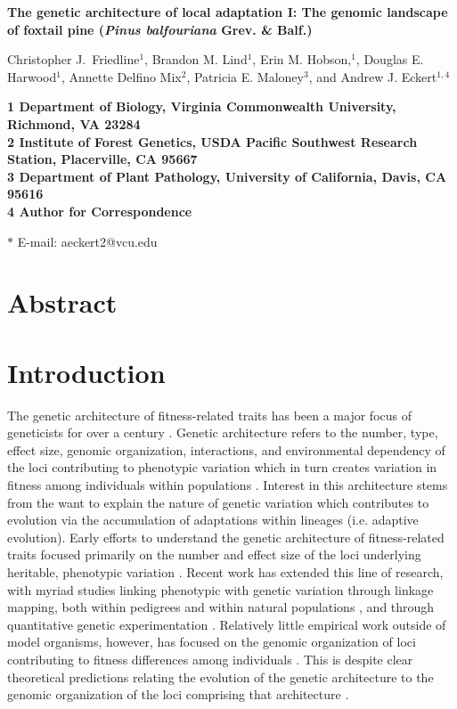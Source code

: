 \documentclass[11pt]{article}
\begin{document}
\begin{flushleft} 
\singlespacing
{\Large \textbf{The genetic architecture of local adaptation I: The genomic landscape of 
foxtail pine (\textit{Pinus balfouriana} Grev. \& Balf.)}}
\null

Christopher J.\ Friedline$^{1}$, 
Brandon M. Lind$^{1}$,
Erin M. Hobson,$^{1}$,
Douglas E. Harwood$^{1}$, 
Annette Delfino Mix$^{2}$,
Patricia E. Maloney$^{3}$, and
Andrew J. Eckert$^{1,4}$
\null

\bf{1} Department of Biology, Virginia Commonwealth University, Richmond, VA 23284
\\
\bf{2} Institute of Forest Genetics, USDA Pacific Southwest Research Station, Placerville, 
CA 95667
\\
\bf{3} Department of Plant Pathology, University of California, Davis, CA 95616
\\
\bf{4} Author for Correspondence
\null

$\ast$ E-mail: aeckert2@vcu.edu
\end{flushleft}

\section*{Abstract}

\section*{Introduction}
The genetic architecture of fitness-related traits has been a major focus of geneticists for 
over a century \citep[reviewed by][]{Ellegren:2008}. Genetic architecture refers to the number, type, effect size, 
genomic organization, interactions, and environmental dependency of the loci contributing to phenotypic variation 
which in turn creates variation in fitness among individuals within populations \citep[cf.][]{Eckert:2012a}. 
Interest in this architecture stems from the want to explain the nature of genetic variation which 
contributes to evolution via the accumulation of adaptations within lineages (i.e. adaptive evolution).
Early efforts to understand the genetic architecture of fitness-related traits
focused primarily on the number and effect size of the loci underlying heritable, phenotypic variation \citep{Fisher:1930}. 
Recent work has extended this line of research, with myriad studies linking phenotypic with genetic variation 
through linkage mapping, both within pedigrees \citep{Mauricio:2001, Neale:2011, Ritland:2011} and within 
natural populations \citep{Ingvarsson:2011, Eckert:2013a}, 
and through quantitative genetic experimentation \citep{Anderson:2013a, Anderson:2013b, Fournier-Level:2013}. Relatively 
little empirical work outside of model organisms, however, has focused on the genomic organization 
of loci contributing to fitness differences 
among individuals \citep[but see][]{Stevison:2011}. This is despite clear theoretical predictions relating the evolution of 
the genetic architecture to the genomic organization of the loci comprising that architecture 
\citep{Kirkpatrick:2006, Yeaman:2011, Yeaman:2013}.
\end{document}
